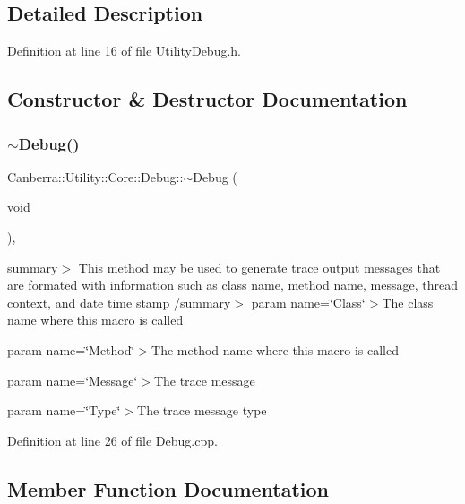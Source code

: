 \subsection{Detailed Description}


Definition at line 16 of file Utility\+Debug.\+h.



\subsection{Constructor \& Destructor Documentation}
\mbox{\label{class_canberra_1_1_utility_1_1_core_1_1_debug_aa5c97c5e6a11f591e099fa07725746c4_aa5c97c5e6a11f591e099fa07725746c4}} 
\subsubsection{\texorpdfstring{$\sim$\+Debug()}{~Debug()}}
{\footnotesize\ttfamily Canberra\+::\+Utility\+::\+Core\+::\+Debug\+::$\sim$\+Debug (\begin{DoxyParamCaption}\item[{void}]{ }\end{DoxyParamCaption})\hspace{0.3cm}{\ttfamily [protected]}, {\ttfamily [virtual]}}

summary$>$ This method may be used to generate trace output messages that are formated with information such as class name, method name, message, thread context, and date time stamp /summary$>$ param name=\char`\"{}\+Class\char`\"{}$>$The class name where this macro is called

param name=\char`\"{}\+Method\char`\"{}$>$The method name where this macro is called

param name=\char`\"{}\+Message\char`\"{}$>$The trace message

param name=\char`\"{}\+Type\char`\"{}$>$The trace message type

Definition at line 26 of file Debug.\+cpp.



\subsection{Member Function Documentation}
\mbox{\label{class_canberra_1_1_utility_1_1_core_1_1_debug_a727e78e36d872ec57a1451d3ff80782d_a727e78e36d872ec57a1451d3ff80782d}} 
